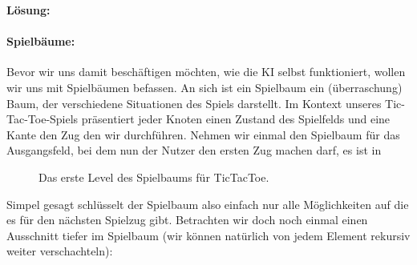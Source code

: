 \documentclass[table]{sopra-base}
\makeatletter
\newenvironment{solution}{\null\par\noindent\textbf{\textcolor{sob@col@uulm@cs}{Lösung:}}\newline\bgroup\color{black}\slshape\ignorespaces}{\egroup}
\makeatother
\begin{document}
\begin{solution}
\paragraph{Spielbäume:}
Bevor wir uns damit beschäftigen möchten, wie die KI selbst funktioniert, wollen wir uns mit Spielbäumen befassen. An sich ist ein Spielbaum ein (überraschung) Baum, der verschiedene Situationen des Spiels darstellt. Im Kontext unseres Tic-Tac-Toe-Spiels präsentiert jeder Knoten einen Zustand des Spielfelds und eine Kante den Zug den wir durchführen. Nehmen wir einmal den Spielbaum für das Ausgangsfeld, bei dem nun der Nutzer den ersten Zug machen darf, es ist in 
\begin{figure}[tbhp]
    \centering{}
    \caption{Das erste Level des Spielbaums für TicTacToe.}
\end{figure}
Simpel gesagt schlüsselt der Spielbaum also einfach nur alle Möglichkeiten auf die es für den nächsten Spielzug gibt. Betrachten wir doch noch einmal einen Ausschnitt tiefer im Spielbaum (wir können natürlich von jedem Element rekursiv weiter verschachteln):\smallskip\\

\end{solution}
\end{document}
